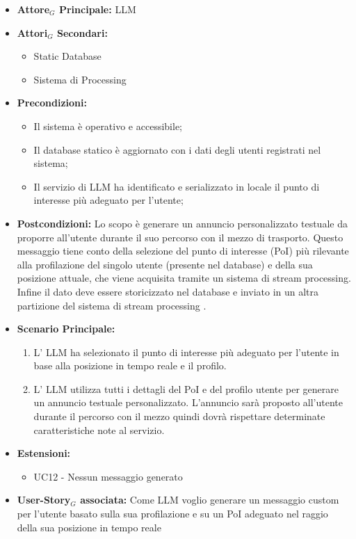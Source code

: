 \documentclass[11pt]{article}
\begin{document}
\begin{justify}
\label{UC11}
\begin{itemize}
    \item \textbf{Attore$_G$ Principale:} LLM
    \item \textbf{Attori$_G$ Secondari:} 
    \begin{itemize}
        \item Static Database
        \item Sistema di Processing
    \end{itemize}
    \item \textbf{Precondizioni:} 
        \begin{itemize}
          \item Il sistema è operativo e accessibile;
          \item Il database statico è aggiornato con i dati degli utenti registrati nel sistema;
            \item Il servizio di LLM ha identificato e serializzato in locale il punto di interesse più adeguato per l'utente;
        \end{itemize}
      \item \textbf{Postcondizioni:} Lo scopo è generare un annuncio personalizzato testuale da proporre all'utente durante il suo percorso con il mezzo di trasporto. Questo messaggio tiene conto della selezione del punto di interesse (PoI) più rilevante alla profilazione del singolo utente (presente nel database) e della sua posizione attuale, che viene acquisita tramite un sistema di stream processing. Infine il dato deve essere storicizzato nel database e inviato in un altra partizione del sistema di stream processing .\\
    \item \textbf{Scenario Principale:} 
        \begin{enumerate}
        \item L' LLM ha selezionato il punto di interesse più adeguato per l'utente in base alla posizione in tempo reale e il profilo.
        \item L' LLM utilizza tutti i dettagli del PoI e del profilo utente per generare un annuncio testuale personalizzato. L'annuncio sarà proposto all'utente durante il percorso con il mezzo quindi dovrà rispettare determinate caratteristiche note al servizio.
        \end{enumerate}
    \item \textbf{Estensioni: } 
    \begin{itemize}
        \item UC12 - Nessun messaggio generato
    \end{itemize}
    \item \textbf{User-Story$_G$ associata:} Come LLM voglio generare un messaggio custom per l'utente basato sulla sua profilazione e su un PoI adeguato nel raggio della sua posizione in tempo reale
\end{itemize}


\end{justify}
\end{document}
